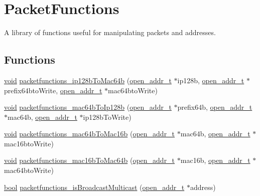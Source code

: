 \hypertarget{group___packet_functions}{}\section{Packet\+Functions}
\label{group___packet_functions}


A library of functions useful for manipulating packets and addresses.  


\subsection*{Functions}
\begin{DoxyCompactItemize}
\item 
\hyperlink{usb__devapi_8h_afabf60e7f57651d6d595a02c75f07cd0}{void} \hyperlink{group___packet_functions_ga3f23f27556fb610f16c170378eeabeec}{packetfunctions\+\_\+ip128b\+To\+Mac64b} (\hyperlink{structopen__addr__t}{open\+\_\+addr\+\_\+t} $\ast$ip128b, \hyperlink{structopen__addr__t}{open\+\_\+addr\+\_\+t} $\ast$prefix64bto\+Write, \hyperlink{structopen__addr__t}{open\+\_\+addr\+\_\+t} $\ast$mac64bto\+Write)
\item 
\hyperlink{usb__devapi_8h_afabf60e7f57651d6d595a02c75f07cd0}{void} \hyperlink{group___packet_functions_ga6d7fd056d46deba15d06d3dc86d3569a}{packetfunctions\+\_\+mac64b\+To\+Ip128b} (\hyperlink{structopen__addr__t}{open\+\_\+addr\+\_\+t} $\ast$prefix64b, \hyperlink{structopen__addr__t}{open\+\_\+addr\+\_\+t} $\ast$mac64b, \hyperlink{structopen__addr__t}{open\+\_\+addr\+\_\+t} $\ast$ip128b\+To\+Write)
\item 
\hyperlink{usb__devapi_8h_afabf60e7f57651d6d595a02c75f07cd0}{void} \hyperlink{group___packet_functions_ga26987c269ac582016eaf905cec7b3ead}{packetfunctions\+\_\+mac64b\+To\+Mac16b} (\hyperlink{structopen__addr__t}{open\+\_\+addr\+\_\+t} $\ast$mac64b, \hyperlink{structopen__addr__t}{open\+\_\+addr\+\_\+t} $\ast$mac16bto\+Write)
\item 
\hyperlink{usb__devapi_8h_afabf60e7f57651d6d595a02c75f07cd0}{void} \hyperlink{group___packet_functions_gab6e0f97c424d57d22794d2c4e0193990}{packetfunctions\+\_\+mac16b\+To\+Mac64b} (\hyperlink{structopen__addr__t}{open\+\_\+addr\+\_\+t} $\ast$mac16b, \hyperlink{structopen__addr__t}{open\+\_\+addr\+\_\+t} $\ast$mac64bto\+Write)
\item 
\hyperlink{_p_e___types_8h_a97a80ca1602ebf2303258971a2c938e2}{bool} \hyperlink{group___packet_functions_gaba1f21e2310fa6bb90ee23eba583e4de}{packetfunctions\+\_\+is\+Broadcast\+Multicast} (\hyperlink{structopen__addr__t}{open\+\_\+addr\+\_\+t} $\ast$address)

\end{DoxyCompactItemize}
